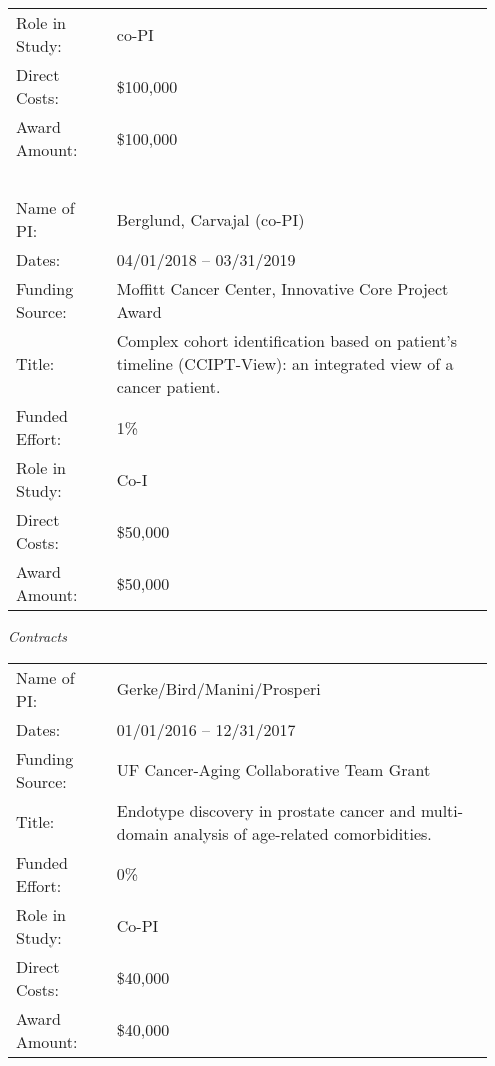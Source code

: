 \documentclass[11pt, a4paper]{article} %
\newcommand{\years}[1]{\marginnote{\scriptsize \raise .3ex\hbox{#1}}} %
\begin{document}
\begin{longtable}{@{}p{0.2\linewidth} p{0.75\linewidth}}
Role in Study: & co-PI\\
Direct Costs: & \$100,000\\
Award Amount: & \$100,000\\
~\\
Name of PI: & Berglund, Carvajal (co-PI) \\
Dates: & 04/01/2018 -- 03/31/2019\\
Funding Source: & Moffitt Cancer Center, Innovative Core Project Award\\
Title: & Complex cohort identification based on patient's timeline (CCIPT-View): an integrated view of a cancer patient.\\
Funded Effort: & 1\%\\
Role in Study: & Co-I \\
Direct Costs: & \$50,000\\
Award Amount: & \$50,000\\
\end{longtable}

\emph{Contracts}

\begin{longtable}{@{}p{0.2\linewidth} p{0.75\linewidth}}
Name of PI: & Gerke/Bird/Manini/Prosperi \\
Dates: & 01/01/2016 -- 12/31/2017\\
Funding Source: & UF Cancer-Aging Collaborative Team Grant\\
Title: & Endotype discovery in prostate cancer and multi-domain analysis of age-related comorbidities.\\
Funded Effort: & 0\%\\
Role in Study: & Co-PI \\
Direct Costs: & \$40,000\\
Award Amount: & \$40,000\\
\end{longtable}

\end{document}
